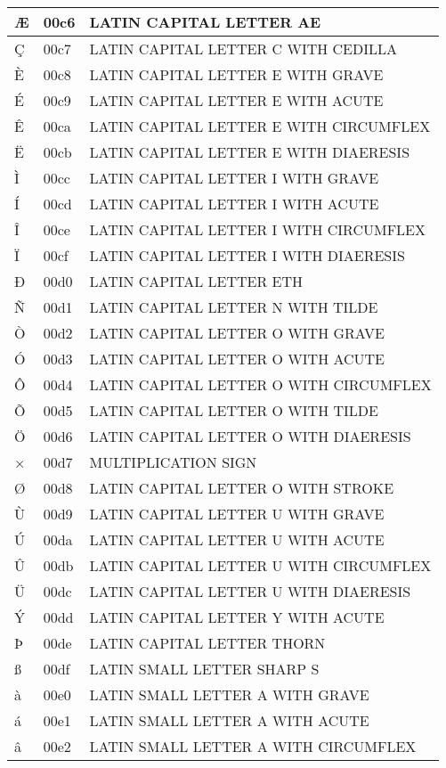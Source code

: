 \documentclass[12pt,letterpaper,openany]{book}
\begin{document}
\begin{center}
\begin{supertabular}{|m{0.25in}|m{0.5in}|m{4in}|}
Æ & 00c6 & LATIN CAPITAL LETTER AE\\\hline
Ç & 00c7 & LATIN CAPITAL LETTER C WITH CEDILLA\\\hline
È & 00c8 & LATIN CAPITAL LETTER E WITH GRAVE\\\hline
É & 00c9 & LATIN CAPITAL LETTER E WITH ACUTE\\\hline
Ê & 00ca & LATIN CAPITAL LETTER E WITH CIRCUMFLEX\\\hline
Ë & 00cb & LATIN CAPITAL LETTER E WITH DIAERESIS\\\hline
Ì & 00cc & LATIN CAPITAL LETTER I WITH GRAVE\\\hline
Í & 00cd & LATIN CAPITAL LETTER I WITH ACUTE\\\hline
Î & 00ce & LATIN CAPITAL LETTER I WITH CIRCUMFLEX\\\hline
Ï & 00cf & LATIN CAPITAL LETTER I WITH DIAERESIS\\\hline
Ð & 00d0 & LATIN CAPITAL LETTER ETH\\\hline
Ñ & 00d1 & LATIN CAPITAL LETTER N WITH TILDE\\\hline
Ò & 00d2 & LATIN CAPITAL LETTER O WITH GRAVE\\\hline
Ó & 00d3 & LATIN CAPITAL LETTER O WITH ACUTE\\\hline
Ô & 00d4 & LATIN CAPITAL LETTER O WITH CIRCUMFLEX\\\hline
Õ & 00d5 & LATIN CAPITAL LETTER O WITH TILDE\\\hline
Ö & 00d6 & LATIN CAPITAL LETTER O WITH DIAERESIS\\\hline
× & 00d7 & MULTIPLICATION SIGN\\\hline
Ø & 00d8 & LATIN CAPITAL LETTER O WITH STROKE\\\hline
Ù & 00d9 & LATIN CAPITAL LETTER U WITH GRAVE\\\hline
Ú & 00da & LATIN CAPITAL LETTER U WITH ACUTE\\\hline
Û & 00db & LATIN CAPITAL LETTER U WITH CIRCUMFLEX\\\hline
Ü & 00dc & LATIN CAPITAL LETTER U WITH DIAERESIS\\\hline
Ý & 00dd & LATIN CAPITAL LETTER Y WITH ACUTE\\\hline
Þ & 00de & LATIN CAPITAL LETTER THORN\\\hline
ß & 00df & LATIN SMALL LETTER SHARP S\\\hline
à & 00e0 & LATIN SMALL LETTER A WITH GRAVE\\\hline
á & 00e1 & LATIN SMALL LETTER A WITH ACUTE\\\hline
â & 00e2 & LATIN SMALL LETTER A WITH CIRCUMFLEX\\\hline

\end{supertabular}
\end{center}
\end{document}
